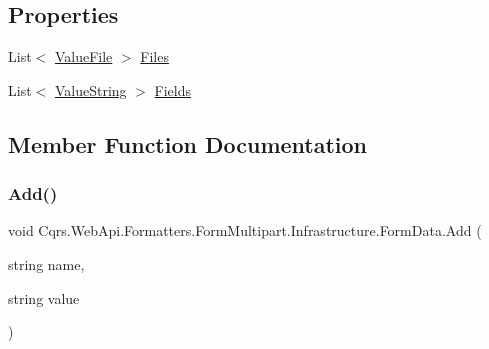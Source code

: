 \subsection*{Properties}
\begin{DoxyCompactItemize}
\item 
List$<$ \hyperlink{classCqrs_1_1WebApi_1_1Formatters_1_1FormMultipart_1_1Infrastructure_1_1FormData_1_1ValueFile}{Value\+File} $>$ \hyperlink{classCqrs_1_1WebApi_1_1Formatters_1_1FormMultipart_1_1Infrastructure_1_1FormData_a09da7b76f703fc20899051d9d9ed17b0}{Files}
\item 
List$<$ \hyperlink{classCqrs_1_1WebApi_1_1Formatters_1_1FormMultipart_1_1Infrastructure_1_1FormData_1_1ValueString}{Value\+String} $>$ \hyperlink{classCqrs_1_1WebApi_1_1Formatters_1_1FormMultipart_1_1Infrastructure_1_1FormData_a91cfdcbb3a074aadee7e7fc228c04a6a}{Fields}
\end{DoxyCompactItemize}


\subsection{Member Function Documentation}
\mbox{\label{classCqrs_1_1WebApi_1_1Formatters_1_1FormMultipart_1_1Infrastructure_1_1FormData_a901e35133be31392947951d78632e593}} 
\subsubsection{\texorpdfstring{Add()}{Add()}\hspace{0.1cm}{\footnotesize\ttfamily [1/2]}}
{\footnotesize\ttfamily void Cqrs.\+Web\+Api.\+Formatters.\+Form\+Multipart.\+Infrastructure.\+Form\+Data.\+Add (\begin{DoxyParamCaption}\item[{string}]{name,  }\item[{string}]{value }\end{DoxyParamCaption})}

